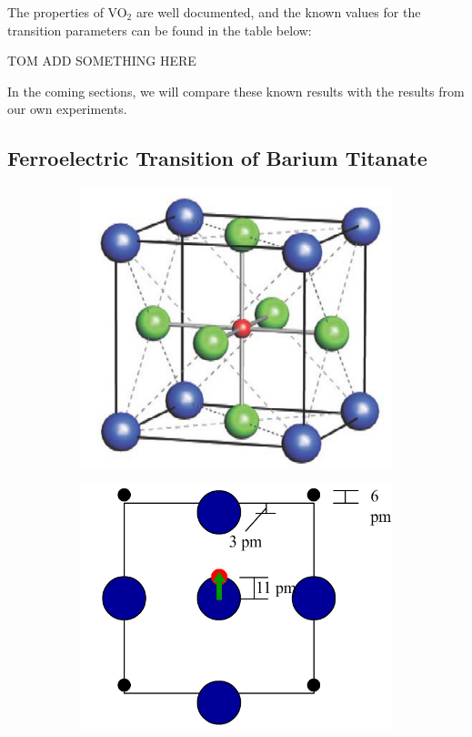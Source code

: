 \documentclass[%
 reprint,
 amsmath,amssymb,
 aps,
 pra,
]{revtex4-1}
\begin{document}
The properties of VO$_2$ are well documented, and the known values for the transition parameters can be found in the table below:

\begin{Huge}
TOM ADD SOMETHING HERE
\end{Huge}

\noindent In the coming sections, we will compare these known results with the results from our own experiments.

\subsection{Ferroelectric Transition of Barium Titanate}

\begin{figure}[H]
	\centering
	\begin{subfigure}{0.22\textwidth}
		\includegraphics[width=1\textwidth]{barium_cubic.png}
		\caption{}
		\label{fig:barium:cubic}
	\end{subfigure}
	\begin{subfigure}{0.24\textwidth}
		\includegraphics[width=\textwidth]{barium_transition_numbers.png} 

\end{subfigure}
\end{figure}
\end{document}

